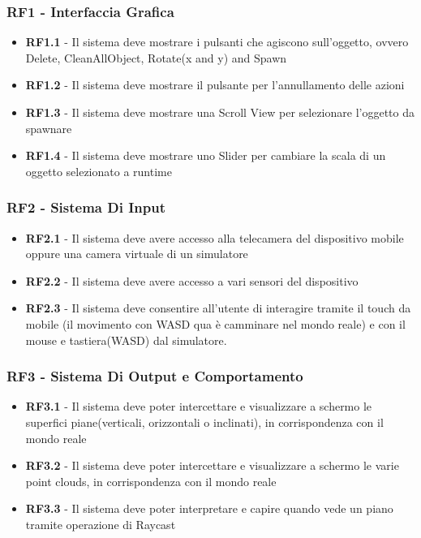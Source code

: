 \subsubsection{RF1 - Interfaccia Grafica}
\begin{itemize}
    \item \textbf{RF1.1} - Il sistema deve mostrare i pulsanti che agiscono sull'oggetto, ovvero Delete, CleanAllObject, Rotate(x and y) and Spawn
    \item \textbf{RF1.2} - Il sistema deve mostrare il pulsante per l'annullamento delle azioni
    \item \textbf{RF1.3} - Il sistema deve mostrare una Scroll View per selezionare l'oggetto da spawnare
    \item \textbf{RF1.4} - Il sistema deve mostrare uno Slider per cambiare la scala di un oggetto selezionato a runtime
\end{itemize}

\subsubsection{RF2 - Sistema Di Input}
\begin{itemize}
    \item \textbf{RF2.1} - Il sistema deve avere accesso alla telecamera del dispositivo mobile oppure una camera virtuale di un simulatore
    \item \textbf{RF2.2} - Il sistema deve avere accesso a vari sensori del dispositivo
    \item \textbf{RF2.3} - Il sistema deve consentire all'utente di interagire tramite il touch da mobile (il movimento con WASD qua è camminare nel mondo reale) e con il mouse e tastiera(WASD) dal simulatore.
\end{itemize}

\subsubsection{RF3 - Sistema Di Output e Comportamento}
\begin{itemize}
    \item \textbf{RF3.1} - Il sistema deve poter intercettare e visualizzare a schermo le superfici piane(verticali, orizzontali o inclinati), in corrispondenza con il mondo reale
    \item \textbf{RF3.2} - Il sistema deve poter intercettare e visualizzare a schermo le varie point clouds, in corrispondenza con il mondo reale 
    \item \textbf{RF3.3} - Il sistema deve poter interpretare e capire quando vede un piano tramite operazione di Raycast
\end{itemize}

